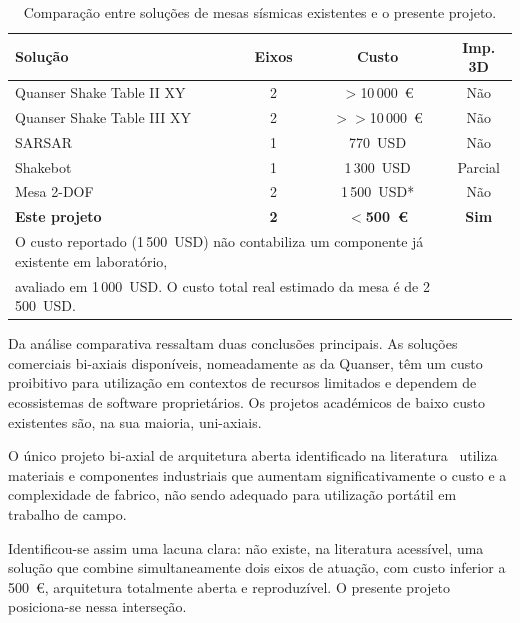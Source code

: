 \begin{table}[h]
\centering
\caption{Comparação entre soluções de mesas sísmicas existentes e o presente projeto.}
\label{tab:comparativo}
\begin{tabular}{lccc}
\hline
\textbf{Solução} & \textbf{Eixos} & \textbf{Custo} & \textbf{Imp. 3D} \\
\hline
Quanser Shake Table II XY~\cite{QuanserShakeTableIIXY} & 2 & $>$10\,000~€ & Não \\
Quanser Shake Table III XY~\cite{QuanserShakeTableIII} & 2 & $>>$10\,000~€ & Não \\
SARSAR~\cite{Damci2018}                                & 1 & 770~USD & Não \\
Shakebot~\cite{Shakebot2022}                           & 1 & 1\,300~USD & Parcial \\
Mesa 2-DOF~\cite{2DOF2025}                             & 2 & 1\,500~USD* & Não \\
\textbf{Este projeto}                                  & \textbf{2} & \textbf{$<$500~€} & \textbf{Sim} \\
\hline
\multicolumn{3}{l}{%
  \footnotesize * O custo reportado (1\,500~USD) não contabiliza um componente já existente em laboratório,}\\
\multicolumn{3}{l}{%
  \footnotesize \phantom{* }avaliado em 1\,000~USD. O custo total real estimado da mesa é de 2\,500~USD.}\\
\end{tabular}
\end{table}

Da análise comparativa ressaltam duas conclusões principais. As soluções comerciais bi-axiais disponíveis, nomeadamente as da Quanser, têm um custo proibitivo para utilização em contextos de recursos limitados e dependem de ecossistemas de software proprietários. Os projetos académicos de baixo custo existentes são, na sua maioria, uni-axiais.

O único projeto bi-axial de arquitetura aberta identificado na literatura~\cite{2DOF2025} utiliza materiais e componentes industriais que aumentam significativamente o custo e a complexidade de fabrico, não sendo adequado para utilização portátil em trabalho de campo.

Identificou-se assim uma lacuna clara: não existe, na literatura acessível, uma solução que combine simultaneamente dois eixos de atuação, com custo inferior a 500~€, arquitetura totalmente aberta e reproduzível. O presente projeto posiciona-se nessa interseção.
